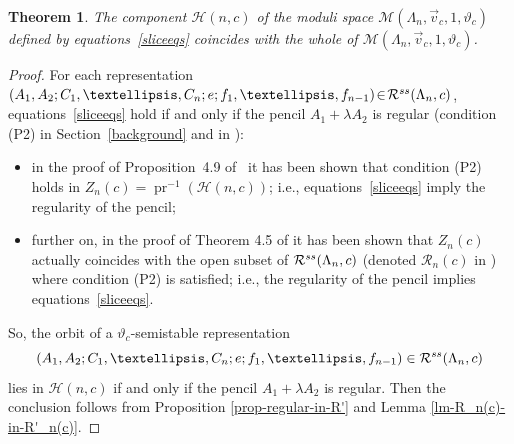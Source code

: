 \documentclass[11pt]{article}
\numberwithin{equation}{section}
\numberwithin{equation}{section}
\newtheorem{Theorem}{Theorem}[section]
\begin{document}
\begin{Theorem}\label{mainthm} The component $\mathcal{H} (n,c) $ of the moduli
space $\mathcal{M}(\Lambda_n,\vec{v}_c, 1, \vartheta_c)$ defined by equations~\eqref{sliceeqs}
coincides with the whole of $\mathcal{M}(\Lambda_n,\vec{v}_c, 1, \vartheta_c)$.
\end{Theorem}
\begin{proof}For each representation $(A_1,A_2;C_1, \dots,C_n;e;f_1,\dots,f_{n-1}) \!\in\! \mathcal{R}^{\rm ss}(\Lambda_n,c)$, equations~\eqref{sliceeqs} hold if and only if the pencil $A_1 + \lambda A_2$ is regular (condition (P2) in Section~\ref{background} and in \cite{bblr}):
\begin{itemize}\itemsep=0pt
 \item in the proof of Proposition~4.9 of~\cite{bblr} it has been shown that condition (P2) holds in $Z_n(c)=\operatorname{pr}^{-1}(\mathcal{H} (n,c))$; i.e., equations~\eqref{sliceeqs} imply the regularity of the pencil;
 \item further on, in the proof of Theorem 4.5 of \cite{bblr} it has been shown that $Z_n(c)$ actually coincides with the open subset of $\mathcal{R}^{\rm ss}(\Lambda_n,c)$ (denoted $\mathcal{R}_n(c)$ in \cite{bblr}) where condition (P2) is satisfied; i.e., the regularity of the pencil implies equations~\eqref{sliceeqs}.
 \end{itemize}
So, the orbit of a $\vartheta_c$-semistable representation \[(A_1,A_2;C_1, \dots,C_n;e;f_1,\dots,f_{n-1}) \in \mathcal{R}^{\rm ss}(\Lambda_n,c)\] lies in $\mathcal{H}(n,c)$ if and only if the pencil $A_1 + \lambda A_2$ is regular. Then the conclusion follows from Proposition \ref{prop-regular-in-R'} and Lemma \ref{lm-R_n(c)-in-R'_n(c)}.
\end{proof}
\end{document}
